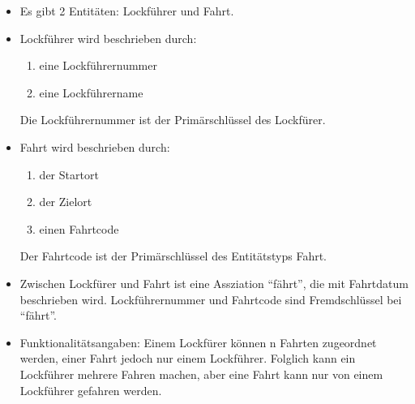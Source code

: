 \documentclass{scrartcl}
\begin{document}
\renewcommand{\theenumi}{\nums}
\begin{itemize}
    \item Es gibt 2 Entitäten: Lockführer und Fahrt.
    \item Lockführer wird beschrieben durch:
    \begin{enumerate}
        \item eine Lockführernummer
        \item eine Lockführername
    \end{enumerate}
    Die Lockführernummer ist der Primärschlüssel des Lockfürer.
    \item Fahrt wird beschrieben durch:
    \begin{enumerate}
        \item der Startort
        \item der Zielort
        \item einen Fahrtcode
    \end{enumerate}
    Der Fahrtcode ist der Primärschlüssel des Entitätstyps Fahrt.
    \item Zwischen Lockfürer und Fahrt ist eine Assziation “fährt”, die mit Fahrtdatum beschrieben wird. Lockführernummer und Fahrtcode sind Fremdschlüssel bei “fährt”.
    \item Funktionalitätsangaben: Einem Lockfürer können n Fahrten zugeordnet werden, einer Fahrt jedoch nur einem Lockführer. Folglich kann ein Lockführer mehrere Fahren machen, aber eine Fahrt kann nur von einem Lockführer gefahren werden. 
\end{itemize}
\end{document}

